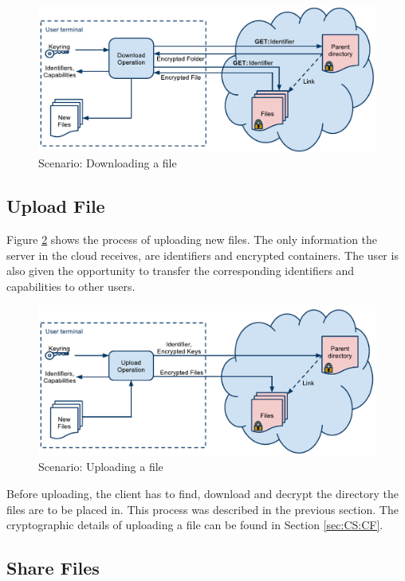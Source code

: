\documentclass[pdftex,english,10pt,b5paper,twoside]{book}
\begin{document}
\begin{figure}[h!]
    \centering
    \includegraphics[width=\columnwidth]{ArchitectureDownload.pdf}
    \caption{Scenario: Downloading a file}
    \label{fig:AS:download}
\end{figure}

\subsection{Upload File}

Figure \ref{fig:AS:upload} shows the process of uploading new files. The only
information the server in the cloud receives, are identifiers and encrypted
containers. The user is also given the opportunity to transfer the corresponding
identifiers and capabilities to other users.

\begin{figure}[h!]
    \centering
    \includegraphics[width=\columnwidth]{ArchitectureUpload.pdf}
    \caption{Scenario: Uploading a file}
    \label{fig:AS:upload}
\end{figure}

Before uploading, the client has to find, download and decrypt the directory the
files are to be placed in. This process was described in the previous section.
The cryptographic details of uploading a file can be found in Section
\ref{sec:CS:CF}.

\subsection{Share Files}
\end{document}

